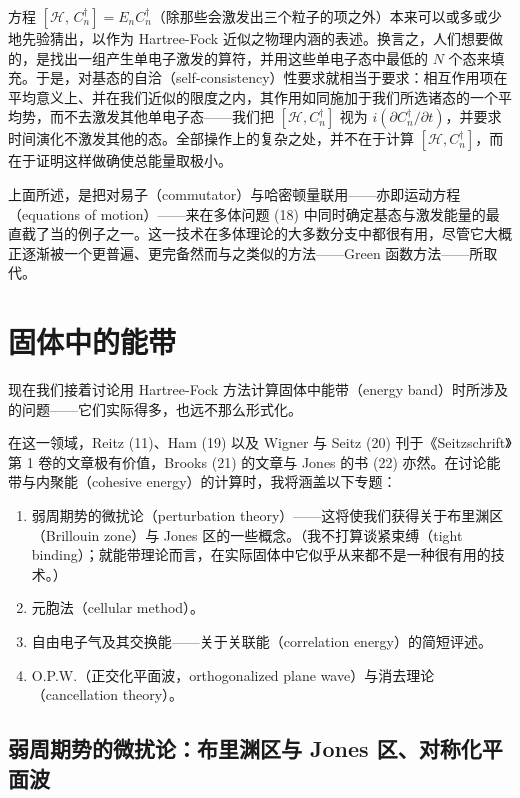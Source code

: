 
方程 $[\mathcal{H},\,C_n^{\dagger}] = E_n C_n^{\dagger}$（除那些会激发出三个粒子的项之外）本来可以或多或少地先验猜出，以作为 Hartree-Fock 近似之物理内涵的表述。换言之，人们想要做的，是找出一组产生单电子激发的算符，并用这些单电子态中最低的 $N$ 个态来填充。于是，对基态的自洽（self-consistency）性要求就相当于要求：相互作用项在平均意义上、并在我们近似的限度之内，其作用如同施加于我们所选诸态的一个平均势，而不去激发其他单电子态——我们把 $[\mathcal{H},C_n^{\dagger}]$ 视为 $i(\partial C_n^{\dagger}/\partial t)$，并要求时间演化不激发其他的态。全部操作上的复杂之处，并不在于计算 $[\mathcal{H},C_n^{\dagger}]$，而在于证明这样做确使总能量取极小。

上面所述，是把对易子（commutator）与哈密顿量联用——亦即运动方程（equations of motion）——来在多体问题 (18) 中同时确定基态与激发能量的最直截了当的例子之一。这一技术在多体理论的大多数分支中都很有用，尽管它大概正逐渐被一个更普遍、更完备然而与之类似的方法——Green 函数方法——所取代。

\section{固体中的能带}

现在我们接着讨论用 Hartree-Fock 方法计算固体中能带（energy band）时所涉及的问题——它们实际得多，也远不那么形式化。

在这一领域，Reitz (11)、Ham (19) 以及 Wigner 与 Seitz (20) 刊于《Seitzschrift》第 1 卷的文章极有价值，Brooks (21) 的文章与 Jones 的书 (22) 亦然。在讨论能带与内聚能（cohesive energy）的计算时，我将涵盖以下专题：

\begin{enumerate}
\item 弱周期势的微扰论（perturbation theory）——这将使我们获得关于布里渊区（Brillouin zone）与 Jones 区的一些概念。（我不打算谈紧束缚（tight binding）；就能带理论而言，在实际固体中它似乎从来都不是一种很有用的技术。）
\item 元胞法（cellular method）。
\item 自由电子气及其交换能——关于关联能（correlation energy）的简短评述。
\item O.P.W.（正交化平面波，orthogonalized plane wave）与消去理论（cancellation theory）。
\end{enumerate}

\subsection{弱周期势的微扰论：布里渊区与 Jones 区、对称化平面波}

